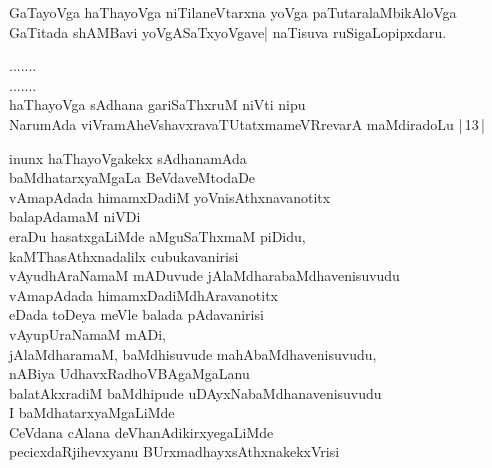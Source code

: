 \begin{entry}

\begin{shl}
GaTayoVga haThayoVga niTilaneVtarxna yoVga paTutaralaMbikAloVga\\
GaTitada shAMBavi yoVgASaTxyoVgave| naTisuva ruSigaLopipxdaru.
\end{shl}
\begin{shl}
.......\\
.......\\
haThayoVga sAdhana gariSaThxruM niVti nipu\\
NarumAda viVramAheVshavxravaTUtatxmameVRrevarA maMdiradoLu |\,13\,|
\end{shl}
\gl{}
\begin{shl}
inunx haThayoVgakekx sAdhanamAda\\
baMdhatarxyaMgaLa BeVdaveMtodaDe\\
vAmapAdada himamxDadiM yoVnisAthxnavanotitx\\
balapAdamaM niVDi\\
eraDu hasatxgaLiMde aMguSaThxmaM piDidu,\\
kaMThasAthxnadalilx cubukavanirisi\\
vAyudhAraNamaM mADuvude jAlaMdharabaMdhavenisuvudu\\
vAmapAdada himamxDadiMdhAravanotitx\\
eDada toDeya meVle balada pAdavanirisi\\
vAyupUraNamaM mADi,\\
jAlaMdharamaM, baMdhisuvude mahAbaMdhavenisuvudu,\\
nABiya UdhavxRadhoVBAgaMgaLanu\\
balatAkxradiM baMdhipude uDAyxNabaMdhanavenisuvudu\\
I baMdhatarxyaMgaLiMde\\
CeVdana cAlana deVhanAdikirxyegaLiMde\\
pecicxdaRjihevxyanu BUrxmadhayxsAthxnakekxVrisi\\

\end{shl}
\end{entry}
